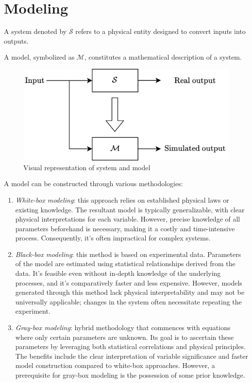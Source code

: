\section{Modeling}

\begin{definition}
    A system denoted by $\mathcal{S}$ refers to a physical entity designed to convert inputs into outputs.
\end{definition}
\begin{definition}
    A model, symbolized as $\mathcal{M}$, constitutes a mathematical description of a system.
\end{definition}

\begin{figure}[H]
    \centering
    \includegraphics[width=0.5\linewidth]{images/model.png}
    \caption{Visual representation of system and model}
\end{figure}

\noindent A model can be constructed through various methodologies:
\begin{enumerate}
    \item \textit{White-box modeling}: this approach relies on established physical laws or existing knowledge. 
        The resultant model is typically generalizable, with clear physical interpretations for each variable.
        However, precise knowledge of all parameters beforehand is necessary, making it a costly and time-intensive process. 
        Consequently, it's often impractical for complex systems.
    \item \textit{Black-box modeling}: this method is based on experimental data. 
        Parameters of the model are estimated using statistical relationships derived from the data. 
        It's feasible even without in-depth knowledge of the underlying processes, and it's comparatively faster and less expensive. 
        However, models generated through this method lack physical interpretability and may not be universally applicable; changes in the system often necessitate repeating the experiment.
    \item \textit{Gray-box modeling}: hybrid methodology that commences with equations where only certain parameters are unknown. 
        Its goal is to ascertain these parameters by leveraging both statistical correlations and physical principles. 
        The benefits include the clear interpretation of variable significance and faster model construction compared to white-box approaches. 
        However, a prerequisite for gray-box modeling is the possession of some prior knowledge.
\end{enumerate}